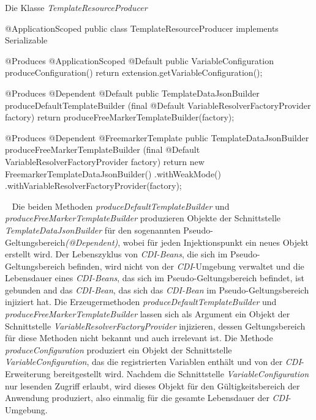 \begin{program}[h]
\caption{Die Klasse \emph{TemplateResourceProducer}}
\label{prog:templateResourceProducer}
\begin{JavaCode}
@ApplicationScoped
public class TemplateResourceProducer implements Serializable {
    @Produces
    @ApplicationScoped
    @Default
    public VariableConfiguration produceConfiguration() {
        return extension.getVariableConfiguration();
    }
    
    @Produces
    @Dependent
    @Default
    public TemplateDataJsonBuilder produceDefaultTemplateBuilder
          (final @Default VariableResolverFactoryProvider factory) {
        return produceFreeMarkerTemplateBuilder(factory);
    }

    @Produces
    @Dependent
    @FreemarkerTemplate
    public TemplateDataJsonBuilder produceFreeMarkerTemplateBuilder
           (final @Default VariableResolverFactoryProvider factory) {
        return new FreemarkerTemplateDataJsonBuilder()
                      .withWeakMode()
                      .withVariableResolverFactoryProvider(factory);
    }
}
\end{JavaCode}
\end{program}
\ \newline
Die beiden Methoden \emph{produceDefaultTemplateBuilder} und \emph{produceFreeMarkerTemplateBuilder} produzieren Objekte der Schnittstelle \emph{TemplateDataJsonBuilder} für den sogenannten Pseudo-Geltungsbereich\emph{(@Dependent)}, wobei für jeden Injektionspunkt ein neues Objekt erstellt wird. Der Lebenszyklus von \emph{CDI-Beans}, die sich im Pseudo-Geltungsbereich befinden, wird nicht von der \emph{CDI}-Umgebung verwaltet und die Lebensdauer eines \emph{CDI-Beans}, das sich im Pseudo-Geltungsbereich befindet, ist gebunden and das \emph{CDI-Bean}, das sich das \emph{CDI-Bean} im Pseudo-Geltungsbereich injiziert hat. Die Erzeugermethoden \emph{produceDefaultTemplateBuilder} und \emph{produceFreeMarkerTemplateBuilder} lassen sich als Argument ein Objekt der Schnittstelle \emph{VariableResolverFactoryProvider} injizieren, dessen Geltungsbereich für diese Methoden nicht bekannt und auch irrelevant ist.
\newline
\newline
Die Methode \emph{produceConfiguration} produziert ein Objekt der Schnittstelle  \emph{VariableConfiguration}, das die registrierten Variablen enthält und von der \emph{CDI}-Erweiterung bereitgestellt wird. Nachdem die Schnittstelle  \emph{VariableConfiguration} nur lesenden Zugriff erlaubt, wird dieses Objekt für den Gültigkeitsbereich der Anwendung produziert, also einmalig für die gesamte Lebensdauer der \emph{CDI}-Umgebung.
